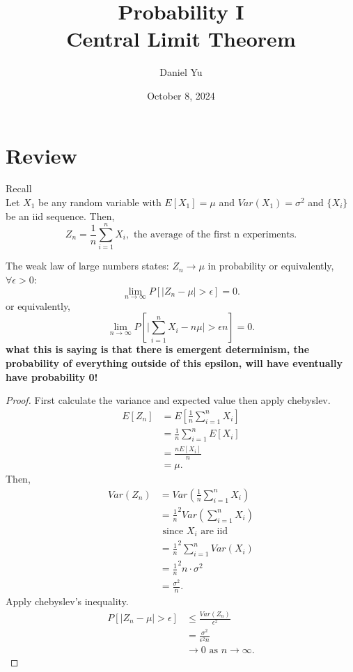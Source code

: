 \documentclass[a4paper]{article}
\title{\Huge{Probability I}\\ Central Limit Theorem}
\author{\huge{Daniel Yu}}
\date{October 8, 2024}
\begin{document}
\maketitle
\newpage%
\tableofcontents
\pagebreak
\section{Review}
Recall\\
Let $X_1$ be any random variable with  $E[X_1] = \mu$ and $Var(X_1) = \sigma^{2}$ and $\{X_i\} $ be an iid sequence. Then,
\[
  Z_n = \frac{1}{n} \sum_{i=1}^{n} X_i, \text{ the average of the first n experiments}
.\] 
\begin{theorem}
  The weak law of large numbers states:
  $Z_n \to \mu$ in probability or equivalently, $\forall \epsilon > 0$:
   \[
     \lim_{n \to \infty} P[\mid Z_n - \mu \mid > \epsilon] = 0
  .\] 
  or equivalently,
  \[
    \lim_{n \to \infty} P[\mid \sum_{i=1}^{n} X_i - n \mu \mid > \epsilon n] = 0
  .\]
  \textbf{what this is saying is that there is emergent determinism, the probability of everything outside of this epsilon, will have eventually have probability 0!}
  \begin{proof}
    First calculate the variance and expected value then apply chebyslev.
    \begin{align*}
      E[Z_n] &= E[\frac{1}{n} \sum_{i=1}^{n} X_i] \\
             &= \frac{1}{n} \sum_{i=1}^{n} E[X_i] \\
             &= \frac{n E[X_i]}{n} \\
             &= \mu
    .\end{align*}
    Then,
    \begin{align*}
      Var(Z_n) &= Var(\frac{1}{n} \sum_{i=1}^{n}X_i) \\
               &= \frac{1}{n}^{2} Var(\sum_{i=1}^{n} X_i) \\
               &\text{ since $X_i$ are iid}\\
               &=  \frac{1}{n}^{2} \sum_{i=1}^{n} Var(X_i) \\
               &= \frac{1}{n}^{2} n \cdot \sigma^{2}\\
               &= \frac{\sigma^{2}}{n}
    .\end{align*}
  Apply chebyslev's inequality.
  \begin{align*}
    P[\mid Z_n - \mu \mid > \epsilon] &\leq \frac{Var(Z_n)}{\epsilon^{2}} \\
                                      &= \frac{\sigma^{2}}{\epsilon^{2}n} \\ 
                                      &\to 0 \text{ as $n \to \infty$}
  .\end{align*}
  \end{proof}
\end{theorem}
\end{document}
